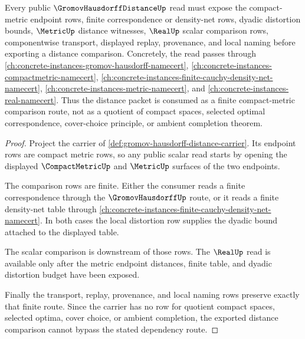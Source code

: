 \begin{theorem}
\label{thm:gromov-hausdorff-distance-density-net-forward-route}
Every public $\GromovHausdorffDistanceUp$ read must expose the compact-metric endpoint rows, finite correspondence or density-net rows, dyadic distortion bounds, $\MetricUp$ distance witnesses, $\RealUp$ scalar comparison rows, componentwise transport, displayed replay, provenance, and local naming before exporting a distance comparison. Concretely, the read passes through \autoref{ch:concrete-instances-gromov-hausdorff-namecert}, \autoref{ch:concrete-instances-compactmetric-namecert}, \autoref{ch:concrete-instances-finite-cauchy-density-net-namecert}, \autoref{ch:concrete-instances-metric-namecert}, and \autoref{ch:concrete-instances-real-namecert}. Thus the distance packet is consumed as a finite compact-metric comparison route, not as a quotient of compact spaces, selected optimal correspondence, cover-choice principle, or ambient completion theorem.
\end{theorem}
\begin{proof}
Project the carrier of \autoref{def:gromov-hausdorff-distance-carrier}. Its endpoint rows are compact metric rows, so any public scalar read starts by opening the displayed $\CompactMetricUp$ and $\MetricUp$ surfaces of the two endpoints.

The comparison rows are finite. Either the consumer reads a finite correspondence through the $\GromovHausdorffUp$ route, or it reads a finite density-net table through \autoref{ch:concrete-instances-finite-cauchy-density-net-namecert}. In both cases the local distortion row supplies the dyadic bound attached to the displayed table.

The scalar comparison is downstream of those rows. The $\RealUp$ read is available only after the metric endpoint distances, finite table, and dyadic distortion budget have been exposed.

Finally the transport, replay, provenance, and local naming rows preserve exactly that finite route. Since the carrier has no row for quotient compact spaces, selected optima, cover choice, or ambient completion, the exported distance comparison cannot bypass the stated dependency route.
\end{proof}
